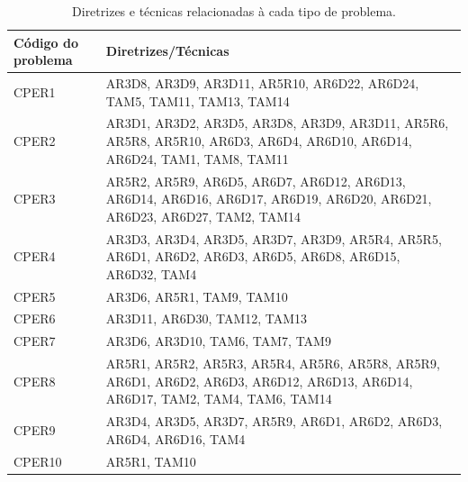 \begin{table}[htb]
    \begin{center}
        \caption{Diretrizes e técnicas relacionadas à cada tipo de problema.}
        \label{tab-tec-pro-1}
        \begin{tabular}{p{2.0cm}|p{12.5cm}}
            \textbf{Código do problema} & \textbf{Diretrizes/Técnicas}                                                                                                  \\
            \hline
            CPER1                       & AR3D8, AR3D9, AR3D11, AR5R10, AR6D22, AR6D24, TAM5, TAM11, TAM13, TAM14                                                       \\
            \hline
            CPER2                       & AR3D1, AR3D2, AR3D5, AR3D8, AR3D9, AR3D11, AR5R6, AR5R8, AR5R10, AR6D3, AR6D4, AR6D10, AR6D14, AR6D24, TAM1, TAM8, TAM11      \\
            \hline
            CPER3                       & AR5R2, AR5R9, AR6D5, AR6D7, AR6D12, AR6D13, AR6D14, AR6D16, AR6D17, AR6D19, AR6D20, AR6D21, AR6D23, AR6D27, TAM2, TAM14       \\
            \hline
            CPER4                       & AR3D3, AR3D4, AR3D5, AR3D7, AR3D9, AR5R4, AR5R5, AR6D1, AR6D2, AR6D3, AR6D5, AR6D8, AR6D15, AR6D32, TAM4                      \\
            \hline
            CPER5                       & AR3D6, AR5R1, TAM9, TAM10                                                                                                     \\
            \hline
            CPER6                       & AR3D11, AR6D30, TAM12, TAM13                                                                                                  \\
            \hline
            CPER7                       & AR3D6, AR3D10, TAM6, TAM7, TAM9                                                                                               \\
            \hline
            CPER8                       & AR5R1, AR5R2, AR5R3, AR5R4, AR5R6, AR5R8, AR5R9, AR6D1, AR6D2, AR6D3, AR6D12, AR6D13, AR6D14, AR6D17, TAM2, TAM4, TAM6, TAM14 \\
            \hline
            CPER9                       & AR3D4, AR3D5, AR3D7, AR5R9, AR6D1, AR6D2, AR6D3, AR6D4, AR6D16, TAM4                                                          \\
            \hline
            CPER10                      & AR5R1, TAM10                                                                                                                  \\
        \end{tabular}
    \end{center}
\end{table}

